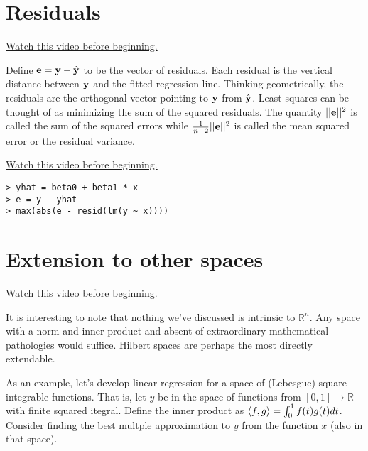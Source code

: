\section{Residuals}
\href{https://www.youtube.com/watch?v=F5yP2GxXeaI&index=18&list=PLpl-gQkQivXhdgUCdaUQcdb31CRe8Mm2y}{Watch this video before beginning.}

Define $\mathbf{e} = \mathbf{y} - \hat {\mathbf{y}}$ to be the vector of residuals. Each residual
is the vertical distance between $\mathbf{y}$ and the fitted regression line. 
Thinking geometrically, the residuals are the orthogonal vector pointing
to $\mathbf{y}$ from $\hat {\mathbf{y}}$. Least squares can be thought of as minimizing
the sum of the squared residuals. The quantity
$||\mathbf{e}||^2 $
is called the sum of the squared errors while $\frac{1}{n-2}||\mathbf{e}||^2$ is
called the mean squared error or the residual variance.

\href{https://www.youtube.com/watch?v=k8szlEkWmAg&list=PLpl-gQkQivXhdgUCdaUQcdb31CRe8Mm2y&index=19}{Watch this video before beginning.}
\begin{verbatim}
> yhat = beta0 + beta1 * x 
> e = y - yhat
> max(abs(e - resid(lm(y ~ x))))
\end{verbatim}


\section{Extension to other spaces}
\href{https://www.youtube.com/watch?v=ax1M0bgi-6E&list=PLpl-gQkQivXhdgUCdaUQcdb31CRe8Mm2y&index=20}{Watch this video before beginning.}

It is interesting to note that nothing we've discussed is intrinsic
to $\mathbb{R}^n$. Any space with a norm and inner product and
absent of extraordinary mathematical pathologies would suffice.  Hilbert spaces are perhaps the most directly extendable. 

As an example, let's develop linear regression for
a space of (Lebesgue) square integrable functions. That is, let $y$ be in the space
of functions from $[0,1] \rightarrow \mathbb{R}$ with finite squared itegral.
Define the inner product as $\langle f, g \rangle = \int_0^1 f(t)g(t)dt$. Consider
finding the best multple approximation to $y$ from the function $x$ (also in that space). 

